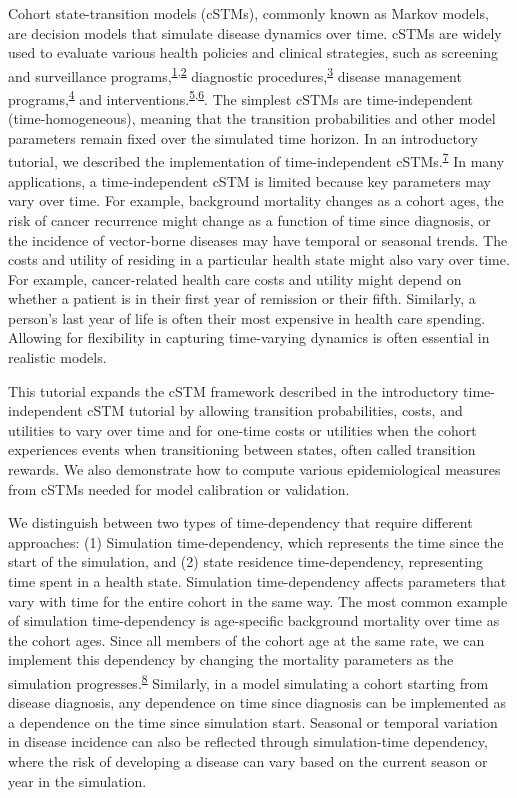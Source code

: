 \documentclass[
]{article}
\begin{document}
Cohort state-transition models (cSTMs), commonly known as Markov models, are decision models that simulate disease dynamics over time. cSTMs are widely used to evaluate various health policies and clinical strategies, such as screening and surveillance programs,\textsuperscript{\protect\hyperlink{ref-Suijkerbuijk2018}{1},\protect\hyperlink{ref-Sathianathen2018a}{2}} diagnostic procedures,\textsuperscript{\protect\hyperlink{ref-Lu2018b}{3}} disease management programs,\textsuperscript{\protect\hyperlink{ref-Djatche2018}{4}} and interventions.\textsuperscript{\protect\hyperlink{ref-Pershing2014}{5},\protect\hyperlink{ref-Smith-Spangler2010}{6}}. The simplest cSTMs are time-independent (time-homogeneous), meaning that the transition probabilities and other model parameters remain fixed over the simulated time horizon. In an introductory tutorial, we described the implementation of time-independent cSTMs.\textsuperscript{\protect\hyperlink{ref-Alarid-Escudero2021a}{7}} In many applications, a time-independent cSTM is limited because key parameters may vary over time. For example, background mortality changes as a cohort ages, the risk of cancer recurrence might change as a function of time since diagnosis, or the incidence of vector-borne diseases may have temporal or seasonal trends. The costs and utility of residing in a particular health state might also vary over time. For example, cancer-related health care costs and utility might depend on whether a patient is in their first year of remission or their fifth. Similarly, a person's last year of life is often their most expensive in health care spending. Allowing for flexibility in capturing time-varying dynamics is often essential in realistic models.

This tutorial expands the cSTM framework described in the introductory time-independent cSTM tutorial by allowing transition probabilities, costs, and utilities to vary over time and for one-time costs or utilities when the cohort experiences events when transitioning between states, often called transition rewards. We also demonstrate how to compute various epidemiological measures from cSTMs needed for model calibration or validation.

We distinguish between two types of time-dependency that require different approaches: (1) Simulation time-dependency, which represents the time since the start of the simulation, and (2) state residence time-dependency, representing time spent in a health state. Simulation time-dependency affects parameters that vary with time for the entire cohort in the same way. The most common example of simulation time-dependency is age-specific background mortality over time as the cohort ages. Since all members of the cohort age at the same rate, we can implement this dependency by changing the mortality parameters as the simulation progresses.\textsuperscript{\protect\hyperlink{ref-Snowsill2019}{8}} Similarly, in a model simulating a cohort starting from disease diagnosis, any dependence on time since diagnosis can be implemented as a dependence on the time since simulation start. Seasonal or temporal variation in disease incidence can also be reflected through simulation-time dependency, where the risk of developing a disease can vary based on the current season or year in the simulation.
\end{document}
